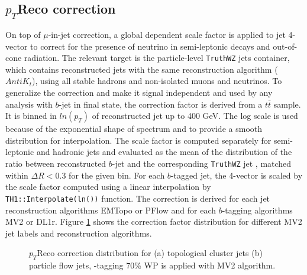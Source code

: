 \subsection{$p_T$Reco correction}
\label{Jet:Cal:BCal:pTReco}
On top of $\mu$-in-jet correction, a global \pT dependent scale factor is applied to jet 4-vector to correct for the presence of neutrino in semi-leptonic decays and out-of-cone radiation. 
The relevant target is the particle-level \texttt{TruthWZ} jets container,
which contains reconstructed jets with the same reconstruction algorithm ($AntiK_t$), 
using all stable hadrons and non-isolated muons and neutrinos. To generalize the correction and make it signal independent and used by any analysis with $b$-jet in final state, the correction factor is derived from a $t\bar{t}$ sample.
It is binned in $ln(p_T)$ of reconstructed jet up to 400 GeV. The log scale is used because of the exponential shape of \pT spectrum and to provide a smooth distribution for interpolation. The scale factor is computed separately for semi-leptonic and hadronic jets and evaluated as the mean of the distribution of the ratio between reconstructed $b$-jet \pT and the  corresponding \texttt{TruthWZ} jet \pT, matched within $\Delta R < 0.3$ for the given \pT bin. For each $b$-tagged jet, the 4-vector is scaled by the scale factor computed using a linear interpolation by \texttt{TH1::Interpolate(ln(\pT))} function.  The correction is derived for each jet reconstruction algorithms EMTopo or PFlow and for each $b$-tagging algorithms MV2 or DL1r. Figure \ref{fig:Jet:Cal:BCal:pTReco} shows the correction factor distribution for different MV2 jet labels and reconstruction algorithms. 
\begin{figure}[ht]
   \centering
   \quad
   \caption{$p_T$Reco correction distribution for (a) topological cluster jets (b) particle flow jets, \bq-tagging 70\% WP is applied with MV2 algorithm.}
   \label{fig:Jet:Cal:BCal:pTReco}
\end{figure}
